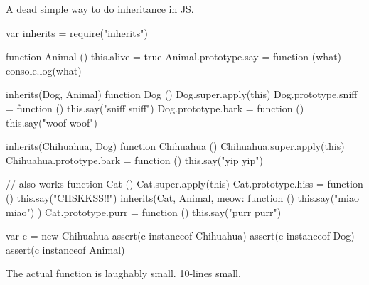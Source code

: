 A dead simple way to do inheritance in JS. \begin{DoxyVerb}var inherits = require("inherits")

function Animal () {
  this.alive = true
}
Animal.prototype.say = function (what) {
  console.log(what)
}

inherits(Dog, Animal)
function Dog () {
  Dog.super.apply(this)
}
Dog.prototype.sniff = function () {
  this.say("sniff sniff")
}
Dog.prototype.bark = function () {
  this.say("woof woof")
}

inherits(Chihuahua, Dog)
function Chihuahua () {
  Chihuahua.super.apply(this)
}
Chihuahua.prototype.bark = function () {
  this.say("yip yip")
}

// also works
function Cat () {
  Cat.super.apply(this)
}
Cat.prototype.hiss = function () {
  this.say("CHSKKSS!!")
}
inherits(Cat, Animal, {
  meow: function () { this.say("miao miao") }
})
Cat.prototype.purr = function () {
  this.say("purr purr")
}


var c = new Chihuahua
assert(c instanceof Chihuahua)
assert(c instanceof Dog)
assert(c instanceof Animal)
\end{DoxyVerb}


The actual function is laughably small. 10-\/lines small. 